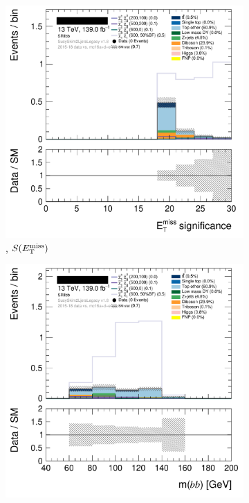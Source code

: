 \begin{figure}[tp]
\centering
\begin{subfigure}{0.48\textwidth}
\centering
\includegraphics[width=\textwidth]{figures/2ljets_def_met_Sign_SRllbb.png}
\caption{\srllbb, $S(E_\mathrm{T}^\mathrm{miss})$}
\end{subfigure}
\hfill
\begin{subfigure}{0.48\textwidth}
\centering
\includegraphics[width=\textwidth]{figures/2ljets_def_mbb_SRllbb.png}

\end{subfigure}
\end{figure}
